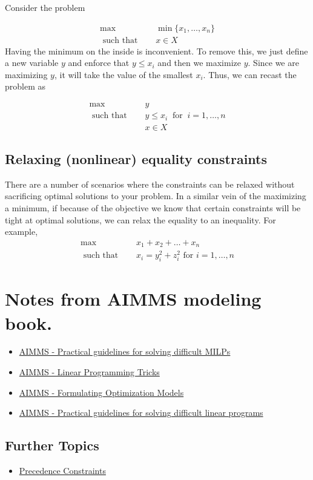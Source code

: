 Consider the problem 

\begin{align*}
\max   \quad & \min \{x_1, \dots, x_n\}\\
\text{ such that } \quad &  x \in X
\end{align*}
Having the minimum on the inside is inconvenient.  To remove this, we just define a new variable $y$ and enforce that $y \leq x_i$ and then we maximize $y$.  Since we are maximizing $y$, it will take the value of the smallest $x_i$.  Thus, we can recast the problem as

\begin{align*}
\max\quad    & y\\
\text{ such that } \quad  & y \leq x_i \ \text{ for }\  i=1, \dots, n \\
&  x \in X
\end{align*}


\subsection{Relaxing (nonlinear) equality constraints}

There are a number of scenarios where the constraints can be relaxed without sacrificing optimal solutions to your problem.   In a similar vein of the maximizing a minimum, if because of the objective we know that certain constraints will be tight at optimal solutions, we can relax the equality to an inequality.   For example, 
\begin{align*}
\max   \quad &x_1 + x_2 +  \dots + x_n\\
\text{ such that } \quad &  x_i = y_i^2 + z_i^2 \text{ for } i=1, \dots, n
\end{align*}






\section{Notes from AIMMS modeling book.}
\begin{itemize}

\item \href{http://inside.mines.edu/~anewman/MIP_practice120212.pdf}{AIMMS - Practical guidelines for solving difficult MILPs}

\item \href{https://download.aimms.com/aimms/download/manuals/AIMMS3OM_LinearProgrammingTricks.pdf}{AIMMS - Linear Programming Tricks}


\item  \href{https://download.aimms.com/aimms/download/manuals/AIMMS3OM_FormulatingOptimizationModels.pdf}{AIMMS - Formulating Optimization Models}


\item \href{https://pdfs.semanticscholar.org/b01f/ad44c20c372fdda95cbfb980c0d37302de07.pdf}{AIMMS - Practical guidelines for solving difficult linear programs}
\end{itemize}
\subsection{Further Topics}
\begin{itemize}
\item \href{https://or.stackexchange.com/questions/1319/best-model-for-precedence-constraints-within-scheduling-problem}{Precedence Constraints}
\end{itemize}

%
